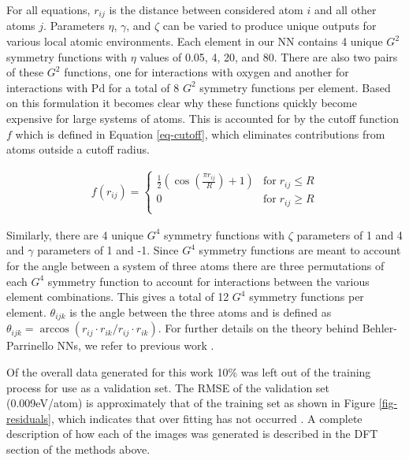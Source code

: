 \documentclass[12pt]{cmuthesis}
\begin{document}
For all equations, \(r_{ij}\) is the distance between considered atom \(i\) and all other atoms \(j\). Parameters \(\eta\), \(\gamma\), and \(\zeta\) can be varied to produce unique outputs for various local atomic environments. Each element in our NN contains 4 unique \(G^{2}\) symmetry functions with \(\eta\) values of 0.05, 4, 20, and 80. There are also two pairs of these \(G^{2}\) functions, one for interactions with oxygen and another for interactions with Pd for a total of 8 \(G^{2}\) symmetry functions per element. Based on this formulation it becomes clear why these functions quickly become expensive for large systems of atoms. This is accounted for by the cutoff function \(f\) which is defined in Equation \ref{eq-cutoff}, which eliminates contributions from atoms outside a cutoff radius.

\begin{eqnarray} \label{eq-cutoff}
f(r_{ij}) =
\begin{cases}
\frac{1}{2} \left(\cos\left(\frac{\pi r_{ij}}{R}\right) +1\right) & \textrm{for} \; r_{ij} \leq R \\
0 & \textrm{for} \; r_{ij} \geq R \\
\end{cases}
\end{eqnarray}

Similarly, there are 4 unique \(G^{4}\) symmetry functions with \(\zeta\) parameters of 1 and 4 and \(\gamma\) parameters of 1 and -1. Since \(G^{4}\) symmetry functions are meant to account for the angle between a system of three atoms there are three permutations of each \(G^{4}\) symmetry function to account for interactions between the various element combinations. This gives a total of 12 \(G^{4}\) symmetry functions per element. \(\theta_{ijk}\) is the angle between the three atoms and is defined as \(\theta_{ijk} = \arccos(r_{ij} \cdot r_{ik} / r_{ij} \cdot r_{ik})\). For further details on the theory behind Behler-Parrinello NNs, we refer to previous work \cite{behler-2007-gener-neural,behler-2011-atom}.

Of the overall data generated for this work 10\% was left out of the training process for use as a validation set. The RMSE of the validation set (0.009eV/atom) is approximately that of the training set as shown in Figure \ref{fig-residuals}, which indicates that over fitting has not occurred \cite{behler-2015-const}. A complete description of how each of the images was generated is described in the DFT section of the methods above.
\end{document}
